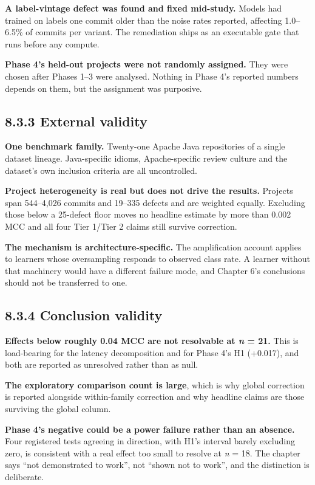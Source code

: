 \textbf{A label-vintage defect was found and fixed mid-study.} Models
had trained on labels one commit older than the noise rates reported,
affecting 1.0--6.5\% of commits per variant. The remediation ships as an
executable gate that runs before any compute.

\textbf{Phase 4's held-out projects were not randomly assigned.} They
were chosen after Phases 1--3 were analysed. Nothing in Phase 4's
reported numbers depends on them, but the assignment was purposive.

\subsection{8.3.3 External validity}\label{external-validity}

\textbf{One benchmark family.} Twenty-one Apache Java repositories of a
single dataset lineage. Java-specific idioms, Apache-specific review
culture and the dataset's own inclusion criteria are all uncontrolled.

\textbf{Project heterogeneity is real but does not drive the results.}
Projects span 544--4,026 commits and 19--335 defects and are weighted
equally. Excluding those below a 25-defect floor moves no headline
estimate by more than 0.002 MCC and all four Tier 1/Tier 2 claims still
survive correction.

\textbf{The mechanism is architecture-specific.} The amplification
account applies to learners whose oversampling responds to observed
class rate. A learner without that machinery would have a different
failure mode, and Chapter 6's conclusions should not be transferred to
one.

\subsection{8.3.4 Conclusion validity}\label{conclusion-validity}

\textbf{Effects below roughly 0.04 MCC are not resolvable at \emph{n} =
21.} This is load-bearing for the latency decomposition and for Phase
4's H1 (+0.017), and both are reported as unresolved rather than as
null.

\textbf{The exploratory comparison count is large}, which is why global
correction is reported alongside within-family correction and why
headline claims are those surviving the global column.

\textbf{Phase 4's negative could be a power failure rather than an
absence.} Four registered tests agreeing in direction, with H1's
interval barely excluding zero, is consistent with a real effect too
small to resolve at \emph{n} = 18. The chapter says ``not demonstrated
to work'', not ``shown not to work'', and the distinction is deliberate.

